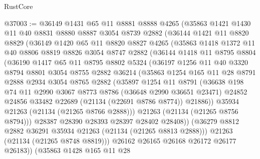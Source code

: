\begin{lexlean}{RustCore}
\begin{coremodule}
@37003 := @36149
    @1431
    @65
    @11
    @8881
    @8888
    @4265
    (@35863
      @1421
      @1430
      @11
      @40
      @8831
      @8880
      @8887
      @3054
      @8739
      @2882
      (@36144
        @1421
        @11
        @8820
        @8829
        (@36149
          @1420
          @65
          @11
          @8820
          @8827
          @4265
          (@35863
            @1418
            @1372
            @11
            @40
            @8806
            @8819
            @8826
            @3054
            @8747
            @2882
            (@36144
              @1418
              @11
              @8795
              @8804
              (@36190
                @1417
                @65
                @11
                @8795
                @8802
                @5324
                (@36197
                  @1256
                  @11
                  @40
                  @3320
                  @8794
                  @8801
                  @3054
                  @8755
                  @2882
                  @36214
                  (@35863
                    @1254
                    @165
                    @11
                    @28
                    @8791
                    @2888
                    @2934
                    @3054
                    @8765
                    @2882
                    (@35897
                      @1254
                      @11
                      @8791
                      (@36638
                        @198
                        @74
                        @11
                        @2990
                        @3067
                        @8773
                        @8786
                        (@36648 @2990 @36651 @23471)
                        @24852
                        @24856
                        @33482
                        @22689
                        (@21134 (@22691 @8786 @8774))
                        @21886))
                    @35934
                    @21263
                    (@21134 (@21265 @8766 @2888)))
                  @21263
                  (@21134 (@21265 @8756 @8794)))
                @28387
                @28390
                @28393
                @28397
                @28402
                @28408))
            (@36279 @8812 @2882 @36291 @35934 @21263 (@21134 (@21265 @8813 @2888)))
            @21263
            (@21134 (@21265 @8748 @8819)))
          @26162
          @26165
          @26168
          @26172
          @26177
          @26183))
      (@35863
        @1428
        @165
        @11
        @28

\end{coremodule}
\end{lexlean}
